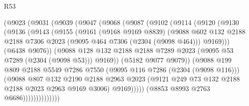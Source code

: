 \begin{lexlean}{R53}
\begin{coremodule}
                  (@9023
                    (@9031
                      (@9039
                        (@9047
                          (@9068
                            (@9087
                              (@9102
                                (@9114
                                  (@9120
                                    (@9130
                                      (@9136
                                        (@9143
                                          (@9155
                                            (@9161
                                              (@9168 @9169 @8839)
                                              (@9088
                                                @602
                                                @132
                                                @2188
                                                @2188
                                                @7306
                                                @2023
                                                (@9095 @464 @7306 (@2304 (@9098 @464)))
                                                @9169)))
                                          (@6438 @9076))
                                        (@9088
                                          @128
                                          @132
                                          @2188
                                          @2188
                                          @7289
                                          @2023
                                          (@9095 @53 @7289 (@2304 (@9098 @53)))
                                          @9169))
                                      (@5182 @9077 @9079))
                                    (@9088
                                      @199
                                      @809
                                      @2188
                                      @5549
                                      @7286
                                      @7550
                                      (@9095 @116 @7286 (@2304 (@9098 @116)))
                                      (@9088
                                        @807
                                        @132
                                        @2190
                                        @2188
                                        @2963
                                        @2023
                                        (@9121 @249 @73 @132 @2188 @2188 @2023 @2963 @9169 @3006)
                                        @9169)))))
                              (@8853 @8993 @2763 @6686))))))))))))))

\end{coremodule}
\end{lexlean}
